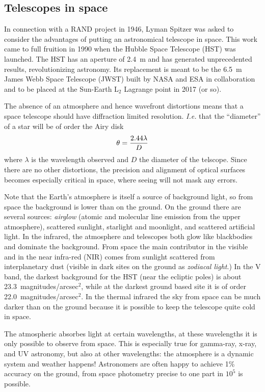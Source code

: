 \subsection{Telescopes in space}

In connection with a RAND project in 1946, Lyman Spitzer was asked to consider the
advantages of putting an astronomical telescope in space. This work came to full fruition
in 1990 when the Hubble Space Telescope (HST) was launched. The HST has an aperture of
2.4~m and has generated unprecedented results, revolutionizing astronomy. Its replacement
is meant to be the 6.5~m James Webb Space Telescope (JWST) built by NASA and ESA in
collaboration and to be placed at the Sun-Earth L$_2$ Lagrange point in 2017 (or so).

The absence of an atmosphere and hence wavefront distortions means that a space telescope 
should have diffraction limited resolution. {\it I.e.} that the ``diameter'' of a star will
be of order the Airy disk
\[
\theta={2.44\lambda\over D}
\]
where $\lambda$ is the wavelength observed and $D$ the diameter of the telscope. Since there
are no other distortions, the precision and alignment of optical surfaces becomes especially 
critical in space, where seeing will not mask any errors.

Note that the Earth's atmosphere is itself a source of background light, so from space the
background is lower than on the ground. On the ground there are several sources: {\it 
airglow} (atomic and molecular line emission from the upper atmosphere), scattered sunlight,
starlight and moonlight, and scattered artificial light. In the infrared, the atmosphere and
telescopes both glow like blackbodies and dominate the background. From space the main
contributor in the visible and in the near infra-red (NIR) comes from sunlight scattered from 
interplanetary dust (visible in dark sites on the ground as {\it zodiacal light}.) In the 
V band, the darkest background for the HST (near the ecliptic poles) is about 
23.3~magnitudes/arcsec$^2$, while at the darkest ground based site it is of order 
22.0~magnitudes/arcsec$^2$. In the thermal infrared the sky from space can be much darker than 
on the ground because it is possible to keep the telescope quite cold in space.

The atmospheric absorbes light at certain wavelengths, at these wavelengths it is only possible
to observe from space. This is especially true for gamma-ray, x-ray, and UV astronomy, but also
at other wavelengths: the atmosphere is a dynamic system and weather happens! Astronomers
are often happy to achieve 1\% accuracy on the ground, from space photometry precise to
one part in $10^5$ is possible.

